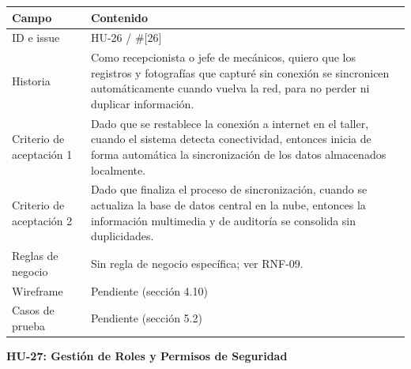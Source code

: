 {\def\LTcaptype{none} %
\begin{longtable}[]{@{}
  >{\raggedright\arraybackslash}p{}
  >{\raggedright\arraybackslash}p{}@{}}
\toprule\noalign{}
\begin{minipage}[b]{\linewidth}\raggedright
\textbf{Campo}
\end{minipage} & \begin{minipage}[b]{\linewidth}\raggedright
\textbf{Contenido}
\end{minipage} \\
\midrule\noalign{}
\endhead
\bottomrule\noalign{}
\endlastfoot
ID e issue & HU-26 / \#{[}26{]} \\
Historia & Como recepcionista o jefe de mecánicos, quiero que los
registros y fotografías que capturé sin conexión se sincronicen
automáticamente cuando vuelva la red, para no perder ni duplicar
información. \\
Criterio de aceptación 1 & Dado que se restablece la conexión a internet
en el taller, cuando el sistema detecta conectividad, entonces inicia de
forma automática la sincronización de los datos almacenados
localmente. \\
Criterio de aceptación 2 & Dado que finaliza el proceso de
sincronización, cuando se actualiza la base de datos central en la nube,
entonces la información multimedia y de auditoría se consolida sin
duplicidades. \\
Reglas de negocio & Sin regla de negocio específica; ver RNF-09. \\
Wireframe & Pendiente (sección 4.10) \\
Casos de prueba & Pendiente (sección 5.2) \\
\end{longtable}
}

\textbf{HU-27: Gestión de Roles y Permisos de Seguridad}

